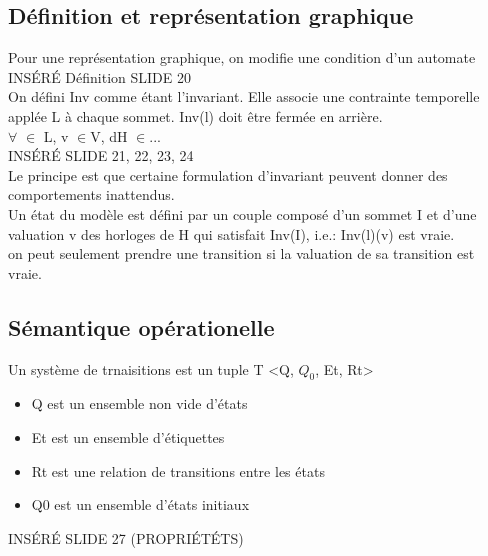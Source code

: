 \documentclass[oneside]{book}
\begin{document}
    \subsection{Définition et représentation graphique}
    Pour une représentation graphique, on  modifie une condition d'un automate \\
    
    INSÉRÉ Définition SLIDE 20\\
    
    On défini Inv comme étant l'invariant. Elle associe une contrainte temporelle applée L à chaque sommet. Inv(l) doit être fermée en arrière.\\
    
    $\forall$ $\in$ L, v $\in$V, dH $\in$...\\
    
    INSÉRÉ SLIDE 21, 22, 23, 24\\
    Le principe est que certaine formulation d'invariant peuvent donner des comportements inattendus.\\
    
    Un état du modèle est défini par un couple composé d'un sommet I et d'une valuation v des horloges de H qui satisfait Inv(I), i.e.: Inv(l)(v) est vraie.\\
    
    on peut seulement prendre une transition si la valuation de sa transition est vraie.\\
    
    
    
    \subsection{Sémantique opérationelle}    
    
    Un système de trnaisitions est un tuple T <Q, $Q_0$, Et, Rt>\\
    \begin{itemize}
        \item Q est un ensemble non vide d'états
        \item Et est un ensemble d'étiquettes
        \item Rt est une relation de transitions entre les états
        \item Q0 est un ensemble d'états initiaux
    \end{itemize}

    INSÉRÉ SLIDE 27 (PROPRIÉTÉTS)\\
    
\end{document}
